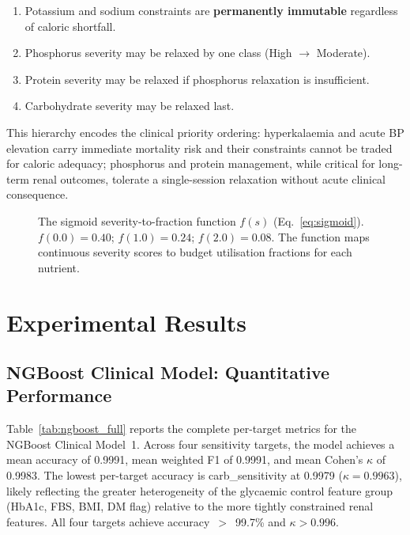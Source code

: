 \documentclass[journal]{IEEEtran}
\begin{document}
\begin{enumerate}
    \item Potassium and sodium constraints are \textbf{permanently
    immutable} regardless of caloric shortfall.
    \item Phosphorus severity may be relaxed by one class (High
    $\rightarrow$ Moderate).
    \item Protein severity may be relaxed if phosphorus relaxation is
    insufficient.
    \item Carbohydrate severity may be relaxed last.
\end{enumerate}

This hierarchy encodes the clinical priority ordering:
hyperkalaemia and acute BP elevation carry immediate mortality risk
and their constraints cannot be traded for caloric adequacy;
phosphorus and protein management, while critical for long-term renal
outcomes, tolerate a single-session relaxation without acute clinical
consequence.

\begin{figure}[!t]
    \centering
    \caption{The sigmoid severity-to-fraction function $f(s)$
    (Eq.~\ref{eq:sigmoid}). $f(0.0) = 0.40$; $f(1.0) = 0.24$;
    $f(2.0) = 0.08$. The function maps continuous severity scores
    to budget utilisation fractions for each nutrient.}
    \label{fig:sigmoid}
\end{figure}

\section{Experimental Results}
\label{sec:results}

\subsection{NGBoost Clinical Model: Quantitative Performance}

Table~\ref{tab:ngboost_full} reports the complete per-target metrics for
the NGBoost Clinical Model~1. Across four sensitivity targets, the model
achieves a mean accuracy of 0.9991, mean weighted F1 of 0.9991, and mean
Cohen's $\kappa$ of 0.9983. The lowest per-target accuracy is
carb\_sensitivity at 0.9979 ($\kappa = 0.9963$), likely reflecting the
greater heterogeneity of the glycaemic control feature group (HbA1c,
FBS, BMI, DM flag) relative to the more tightly constrained renal
features. All four targets achieve accuracy~$>$~99.7\% and
$\kappa > 0.996$.
\end{document}
